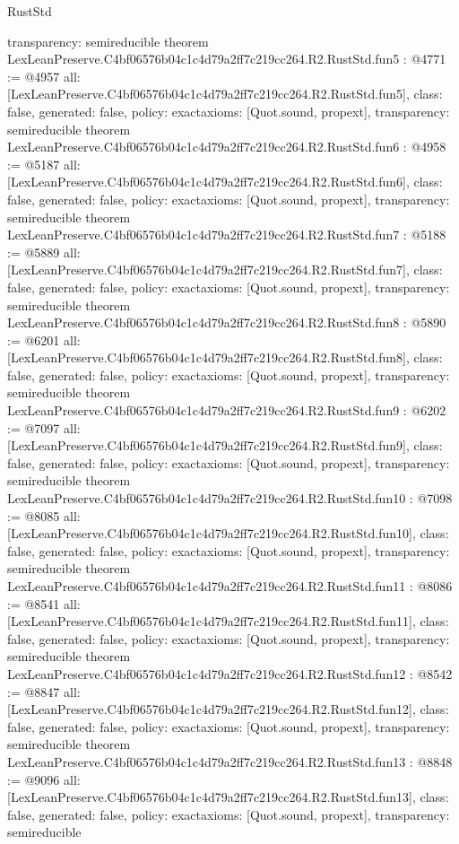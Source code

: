 \begin{lexlean}{RustStd}
\begin{coremodule}
{  transparency: semireducible
}
theorem LexLeanPreserve.C4bf06576b04c1c4d79a2ff7c219cc264.R2.RustStd.fun5 : @4771 := @4957 {
  all: [LexLeanPreserve.C4bf06576b04c1c4d79a2ff7c219cc264.R2.RustStd.fun5],
  class: false,
  generated: false,
  policy: exact{axioms: [Quot.sound, propext]},
  transparency: semireducible
}
theorem LexLeanPreserve.C4bf06576b04c1c4d79a2ff7c219cc264.R2.RustStd.fun6 : @4958 := @5187 {
  all: [LexLeanPreserve.C4bf06576b04c1c4d79a2ff7c219cc264.R2.RustStd.fun6],
  class: false,
  generated: false,
  policy: exact{axioms: [Quot.sound, propext]},
  transparency: semireducible
}
theorem LexLeanPreserve.C4bf06576b04c1c4d79a2ff7c219cc264.R2.RustStd.fun7 : @5188 := @5889 {
  all: [LexLeanPreserve.C4bf06576b04c1c4d79a2ff7c219cc264.R2.RustStd.fun7],
  class: false,
  generated: false,
  policy: exact{axioms: [Quot.sound, propext]},
  transparency: semireducible
}
theorem LexLeanPreserve.C4bf06576b04c1c4d79a2ff7c219cc264.R2.RustStd.fun8 : @5890 := @6201 {
  all: [LexLeanPreserve.C4bf06576b04c1c4d79a2ff7c219cc264.R2.RustStd.fun8],
  class: false,
  generated: false,
  policy: exact{axioms: [Quot.sound, propext]},
  transparency: semireducible
}
theorem LexLeanPreserve.C4bf06576b04c1c4d79a2ff7c219cc264.R2.RustStd.fun9 : @6202 := @7097 {
  all: [LexLeanPreserve.C4bf06576b04c1c4d79a2ff7c219cc264.R2.RustStd.fun9],
  class: false,
  generated: false,
  policy: exact{axioms: [Quot.sound, propext]},
  transparency: semireducible
}
theorem LexLeanPreserve.C4bf06576b04c1c4d79a2ff7c219cc264.R2.RustStd.fun10 : @7098 := @8085 {
  all: [LexLeanPreserve.C4bf06576b04c1c4d79a2ff7c219cc264.R2.RustStd.fun10],
  class: false,
  generated: false,
  policy: exact{axioms: [Quot.sound, propext]},
  transparency: semireducible
}
theorem LexLeanPreserve.C4bf06576b04c1c4d79a2ff7c219cc264.R2.RustStd.fun11 : @8086 := @8541 {
  all: [LexLeanPreserve.C4bf06576b04c1c4d79a2ff7c219cc264.R2.RustStd.fun11],
  class: false,
  generated: false,
  policy: exact{axioms: [Quot.sound, propext]},
  transparency: semireducible
}
theorem LexLeanPreserve.C4bf06576b04c1c4d79a2ff7c219cc264.R2.RustStd.fun12 : @8542 := @8847 {
  all: [LexLeanPreserve.C4bf06576b04c1c4d79a2ff7c219cc264.R2.RustStd.fun12],
  class: false,
  generated: false,
  policy: exact{axioms: [Quot.sound, propext]},
  transparency: semireducible
}
theorem LexLeanPreserve.C4bf06576b04c1c4d79a2ff7c219cc264.R2.RustStd.fun13 : @8848 := @9096 {
  all: [LexLeanPreserve.C4bf06576b04c1c4d79a2ff7c219cc264.R2.RustStd.fun13],
  class: false,
  generated: false,
  policy: exact{axioms: [Quot.sound, propext]},
  transparency: semireducible
}
\end{coremodule}
\end{lexlean}
